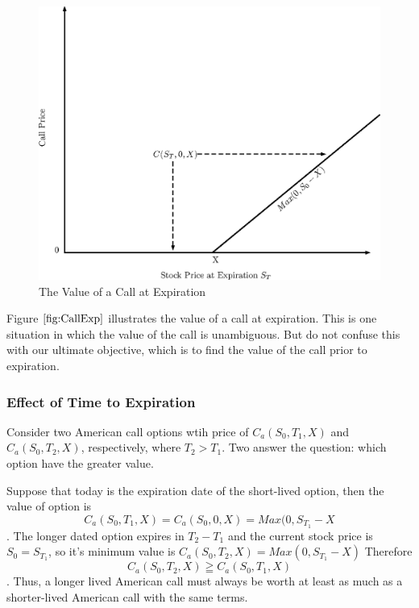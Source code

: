\documentclass{book}
\theoremstyle{definition}
\theoremstyle{remark}
\begin{document}
                \begin{figure}[h]
                    \centering
                        \includegraphics[scale=0.65]{images/fig:CallExp.eps}
                    \caption{The Value of a Call at Expiration}
                    \label{fig:CallExp}                
                \end{figure}            
            Figure $\ref{fig:CallExp}$ illustrates the value of a call at expiration. This is one situation in which the value of the call is unambiguous. But do not confuse this with our ultimate objective, which is to find the value of the call prior to expiration.
   
        \subsubsection{Effect of Time to Expiration}
            Consider two American call options wtih price of $C_a(S_0,T_1,X)$ and $C_a(S_0,T_2,X)$, respectively, where $T_2 > T_1$. Two answer the question: which option have the greater value. 
            
            Suppose that today is the expiration date of the short-lived option, then the value of option is $$ C_a(S_0,T_1,X) = C_a(S_0, 0, X) = Max(0, S_{T_1}-X$$. The longer dated option expires in $T_2 - T_1$ and the current stock price is $S_0 = S_{T_1}$, so it's minimum value is  $C_a(S_0, T_2, X) = Max(0, S_{T_1}-X)$ Therefore $$ C_a(S_0, T_2, X) \geqq C_a(S_0, T_1, X) $$. Thus, a longer lived American call must always be worth at least as much as a shorter-lived American call with the same terms. 
            
\end{document}
